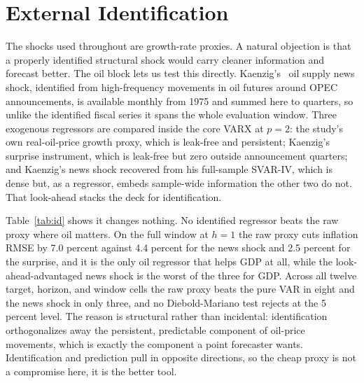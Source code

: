 \documentclass[conference]{IEEEtran}
\begin{document}
\section{External Identification}
The shocks used throughout are growth-rate proxies. A natural objection is that a properly identified structural shock would carry cleaner information and forecast better. The oil block lets us test this directly. Kaenzig's~\cite{kanzig2021} oil supply news shock, identified from high-frequency movements in oil futures around OPEC announcements, is available monthly from 1975 and summed here to quarters, so unlike the identified fiscal series it spans the whole evaluation window. Three exogenous regressors are compared inside the core VARX at $p=2$: the study's own real-oil-price growth proxy, which is leak-free and persistent; Kaenzig's surprise instrument, which is leak-free but zero outside announcement quarters; and Kaenzig's news shock recovered from his full-sample SVAR-IV, which is dense but, as a regressor, embeds sample-wide information the other two do not. That look-ahead stacks the deck for identification.

Table~\ref{tab:id} shows it changes nothing. No identified regressor beats the raw proxy where oil matters. On the full window at $h=1$ the raw proxy cuts inflation RMSE by 7.0 percent against 4.4 percent for the news shock and 2.5 percent for the surprise, and it is the only oil regressor that helps GDP at all, while the look-ahead-advantaged news shock is the worst of the three for GDP. Across all twelve target, horizon, and window cells the raw proxy beats the pure VAR in eight and the news shock in only three, and no Diebold-Mariano test rejects at the 5 percent level. The reason is structural rather than incidental: identification orthogonalizes away the persistent, predictable component of oil-price movements, which is exactly the component a point forecaster wants. Identification and prediction pull in opposite directions, so the cheap proxy is not a compromise here, it is the better tool.
\end{document}
